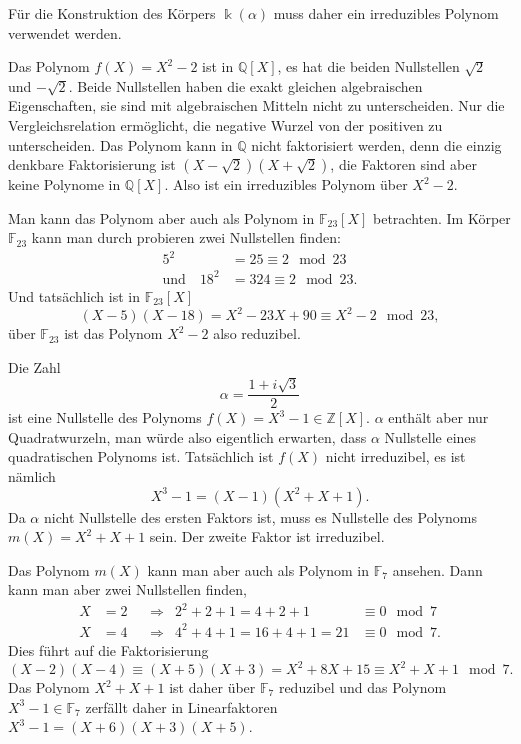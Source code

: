 Für die Konstruktion des Körpers $\Bbbk(\alpha)$ muss daher ein irreduzibles
Polynom verwendet werden.

\begin{beispiel}
Das Polynom $f(X)=X^2-2$ ist in $\mathbb{Q}[X]$, es hat die beiden
Nullstellen $\sqrt{2}$ und $-\sqrt{2}$.
Beide Nullstellen haben die exakt gleichen algebraischen Eigenschaften,
sie sind mit algebraischen Mitteln nicht zu unterscheiden.
Nur die Vergleichsrelation ermöglicht, die negative Wurzel von der
positiven zu unterscheiden.
Das Polynom kann in $\mathbb{Q}$ nicht faktorisiert werden, denn die
einzig denkbare Faktorisierung ist $(X-\sqrt{2})(X+\sqrt{2})$, die
Faktoren sind aber keine Polynome in $\mathbb{Q}[X]$.
Also ist ein irreduzibles Polynom über $X^2-2$.

Man kann das Polynom aber auch als Polynom in $\mathbb{F}_{23}[X]$
betrachten.
Im Körper $\mathbb{F}_{23}$ kann man durch probieren zwei Nullstellen
finden:
\begin{align*}
5^2 &= 25\equiv 2\mod 23
\\
\text{und}\quad
18^2 &=324 \equiv 2 \mod 23.
\end{align*}
Und tatsächlich ist in $\mathbb{F}_{23}[X]$
\[
(X-5)(X-18) = X^2 -23X+90
\equiv
X^2 -2 \mod 23,
\]
über $\mathbb{F}_{23}$ ist das Polynom $X^2-2$ also reduzibel.
\end{beispiel}

\begin{beispiel}
Die Zahl 
\[
\alpha = \frac{1+i\sqrt{3}}2
\]
ist eine Nullstelle des Polynoms $f(X)=X^3-1\in\mathbb{Z}[X]$.
$\alpha$ enthält aber nur Quadratwurzeln, man würde also eigentlich
erwarten, dass $\alpha$ Nullstelle eines quadratischen Polynoms ist.
Tatsächlich ist $f(X)$ nicht irreduzibel,  es ist nämlich
\[
X^3-1 = (X-1)(X^2+X+1).
\]
Da $\alpha$ nicht Nullstelle des ersten Faktors ist, muss es Nullstelle
des Polynoms $m(X)=X^2+X+1$ sein.
Der zweite Faktor ist irreduzibel.

Das Polynom $m(X)$ kann man aber auch als Polynom in $\mathbb{F}_7$ 
ansehen.
Dann kann man aber zwei Nullstellen finden,
\[
\begin{aligned}
X&=2&&\Rightarrow& 2^2+2+1=4+2+1&\equiv 0\mod 7
\\
X&=4&&\Rightarrow& 4^2+4+1=16+4+1=21&\equiv 0\mod 7.
\end{aligned}
\]
Dies führt auf die Faktorisierung
\[
(X-2)(X-4)
\equiv
(X+5)(X+3)
=
X^2+8X+15
\equiv
X^2+X+1\mod 7.
\]
Das Polynom $X^2+X+1$ ist daher über $\mathbb{F}_7$ reduzibel und
das Polynom $X^3-1\in\mathbb{F}_7$ zerfällt daher in Linearfaktoren
$X^3-1=(X+6)(X+3)(X+5)$.
\end{beispiel}


